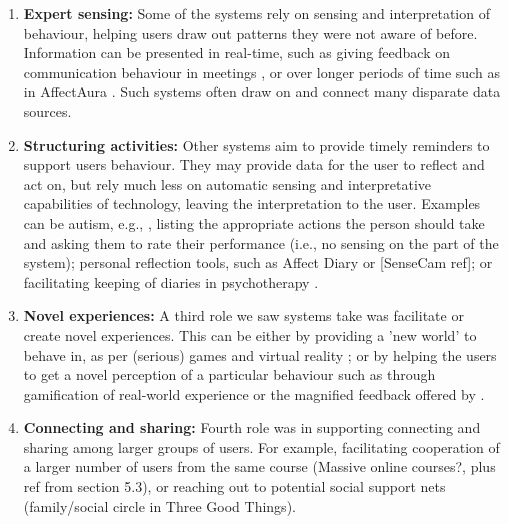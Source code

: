 \documentclass[prodmode,acmtochi]{acmsmall}
\newcommand{\todo}[1]{\textrm{\textrm{\textcolor{LightBlue}{[[#1]]}}}}
\begin{document}
        \begin{enumerate}
                \item {\bf Expert sensing:} Some of the systems rely on sensing and interpretation of behaviour, helping users draw out patterns they were not aware of before. Information can be presented in real-time, such as giving feedback on communication behaviour in meetings \cite{Kim2008,DiMicco2007}, or over longer periods of time such as in AffectAura \cite{McDuff2012}. Such systems often draw on and connect many disparate data sources. 
                


                \item {\bf Structuring activities:} Other systems aim to provide timely reminders to support users behaviour. They may provide data for the user to reflect and act on, but rely much less on automatic sensing and interpretative capabilities of technology, leaving the  interpretation to the user. Examples can be autism, e.g., \cite{Escobedo2012}, listing the appropriate actions the person should take and asking them to rate their performance (i.e., no sensing on the part of the system); personal reflection tools, such as Affect Diary \cite{Stahl2008} or [SenseCam ref]; or facilitating keeping of diaries in psychotherapy \cite{Matthews2011}.  

                \item {\bf Novel experiences:} A third role we saw systems take was facilitate or create novel experiences. This can be either by providing a 'new world' to behave in,  as per (serious) games \cite{Hailpern2011} and virtual reality \cite{Bouchard2012,Romano2005};  or by helping the users to get a novel perception of a particular behaviour such as through gamification of real-world experience or the magnified feedback offered by . 

                \item {\bf Connecting and sharing:} Fourth role was in supporting connecting and sharing among larger groups of users. For example, facilitating cooperation of a larger number of users from the same course (Massive online courses?, plus ref from section 5.3), or reaching out to potential social support nets (family/social circle in Three Good Things). 
        \end{enumerate}
\end{document}
